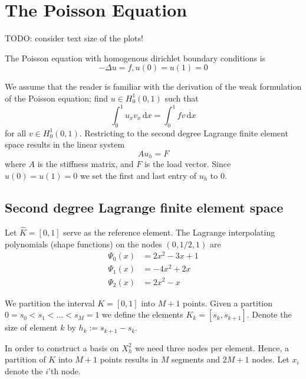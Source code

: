 \section{The Poisson Equation}

TODO: consider text size of the plots!

The Poisson equation with homogenous dirichlet boundary conditions is
\begin{equation}
    - \Delta u = f, u(0) = u(1) = 0
\end{equation}

We assume that the reader is familiar with the
derivation of the weak formulation of the Poisson equation;
find \( u \in H_0^1(0, 1) \) such that
\begin{equation}
  \label{eq:weak}
    \int_{0}^{1}u_x v_x \,\mathrm{d}x = \int_{0}^{1}f v \,\mathrm{d}x
\end{equation}
for all \( v \in H^1_0 (0,1)\).
Restricting to the second degree Lagrange finite element space
results in the linear system
\begin{equation}
    Au_h = F
\end{equation}
where \( A \) is the stiffness matrix,
and \( F \) is the load vector.
Since \( u(0) = u(1) = 0 \) we set
the first and last entry of \( u_h \)
to \( 0 \).

\subsection{Second degree Lagrange finite element space}\label{sec:sec}

Let \( \hat{K} = [0, 1] \) serve as the reference element.
The Lagrange interpolating polynomials (shape functions)
on the nodes \( (0, 1/2, 1) \) are
\begin{align}
  \Psi_0(x) &= 2x^2 - 3x + 1\\
  \Psi_1(x) &= -4x^2 + 2x\\
  \Psi_2(x) &= 2x^2 - x
\end{align}

We partition the interval \( K = [0, 1] \) into \( M + 1 \) points.
Given a partition \( 0 = s_0 < s_1 < \dots < s_M = 1  \)
we define the elements \( K_k = [s_{k}, s_{k+1}] \).
Denote the size of element \( k \) by \( h_k := s_{k+1} - s_{k} \).

In order to construct a basis on \( X_h^2 \) we need three
nodes per element.
Hence, a partition of \( K \) into \( M + 1 \) points
results in \( M \) segments and \( 2M + 1 \) nodes.
Let \( x_i \) denote the \( i \)'th node.

